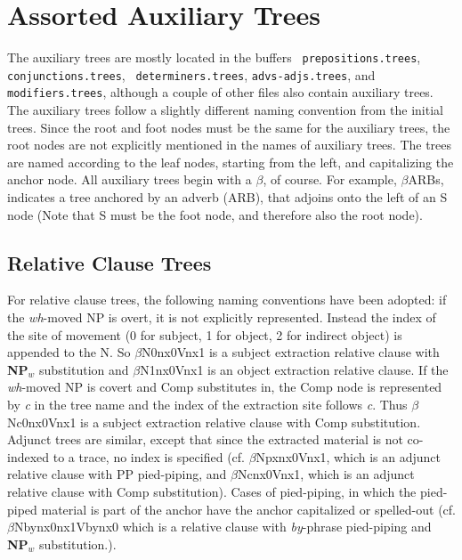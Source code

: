 \section{Assorted Auxiliary Trees}

The auxiliary trees are mostly located in the buffers {\tt
prepositions.trees}, {\tt conjunctions.trees}, {\tt
determiners.trees}, {\tt advs-adjs.trees}, and {\tt modifiers.trees},
although a couple of other files also contain auxiliary trees.  The
auxiliary trees follow a slightly different naming convention from the
initial trees.  Since the root and foot nodes must be the same for the
auxiliary trees, the root nodes are not explicitly mentioned in the
names of auxiliary trees.  The trees are named according to the leaf
nodes, starting from the left, and capitalizing the anchor node.  All
auxiliary trees begin with a $\beta$, of course.  For example,
$\beta$ARBs, indicates a tree anchored by an adverb (ARB), that
adjoins onto the left of an S node (Note that S must be the foot node,
and therefore also the root node).

\subsection{Relative Clause Trees}
For relative clause trees, the following naming conventions have been
adopted: if the {\em wh}-moved NP is overt, it is not explicitly
represented. Instead the index of the site of movement
(0 for subject, 1 for object, 2 for indirect object) is appended to the
N. So $\beta$N0nx0Vnx1 is a subject
extraction relative clause with {\bf NP$_{w}$} substitution
and $\beta$N1nx0Vnx1 is an object extraction
relative clause. If the {\em wh}-moved NP is covert and Comp substitutes
in, the Comp node is represented by {\em c} in the tree name and the
index of the extraction site follows {\em c}. Thus
$\beta$Nc0nx0Vnx1 is a subject extraction
relative clause with Comp substitution. Adjunct trees are similar, except
that since the extracted material is not co-indexed to a trace, no index
is specified (cf. $\beta$Npxnx0Vnx1, which is an adjunct relative clause with
PP pied-piping, and $\beta$Ncnx0Vnx1, which is an adjunct relative clause
with Comp substitution). Cases of pied-piping, in which the pied-piped
material is part of the anchor have the anchor capitalized or spelled-out
(cf. $\beta$Nbynx0nx1Vbynx0 which is a relative clause with {\em by}-phrase
pied-piping and {\bf NP$_{w}$} substitution.).

